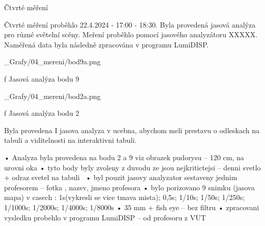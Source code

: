 \sec Čtvrté měření

Čtvrté měření proběhlo 22.4.2024 - 17:00 - 18:30. Byla provedená jasová analýza pro různé světelní scény. Meření proběhlo pomocí jasového analyzátoru XXXXX. Naměřená data byla následně zpracována v programu LumiDISP.

\medskip
\medskip {}
\picw=14cm _Grafy/04_mereni/bod9a.png
\caption/f Jasová analýza bodu 9
\medskip

\medskip
\medskip {}
\picw=14cm _Grafy/04_mereni/bod2a.png
\caption/f Jasová analýza bodu 2
\medskip
\medskip

Byla provedena I jasova analyza v ucebna, abychom meli prestavu o odleskach na tabuli a viditelnosti na interaktivni tabuli.

    • Analyza byla provedena na bodu 2 a 9 viz obrazek pudorysu – 120 cm, na urovni oka
    \medskip
    • tyto body byly zvoleny z duvodu ze jsou nejkritictejsi – denni svetlo + odraz svetel na tabuli\
    \medskip
    • byl pouzit jasovy analyzator sestaveny jednim profesorem – fotka , nazev, jmeno profesora
    \medskip
    • bylo porizovano 9 snimku (jasova mapa) v casech : 1s(vykresli se vice tmava mista); 0,5s; 1/10s; 1/50s; 1/250s; 1/1000s; 1/2000s; 1/4000s; 1/8000s
    \medskip
    • 35 mm + fish eye – bez filtru
    \medskip
    • zpracovani vysledku probehlo v programu LumiDISP – od profesoru z VUT




















